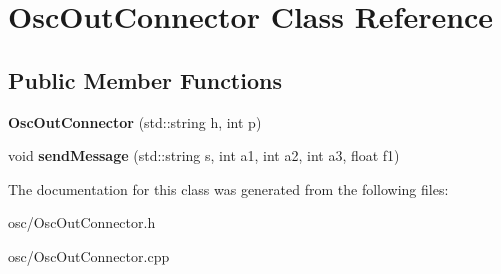 \hypertarget{classOscOutConnector}{}\section{Osc\+Out\+Connector Class Reference}
\label{classOscOutConnector}
\subsection*{Public Member Functions}
\begin{DoxyCompactItemize}
\item 
{\bfseries Osc\+Out\+Connector} (std\+::string h, int p)\hypertarget{classOscOutConnector_a7dde00203135c4a673e56f02dec774b4}{}\label{classOscOutConnector_a7dde00203135c4a673e56f02dec774b4}

\item 
void {\bfseries send\+Message} (std\+::string s, int a1, int a2, int a3, float f1)\hypertarget{classOscOutConnector_a8b3bcadf0295998b42753161ae9d17ee}{}\label{classOscOutConnector_a8b3bcadf0295998b42753161ae9d17ee}

\end{DoxyCompactItemize}


The documentation for this class was generated from the following files\+:\begin{DoxyCompactItemize}
\item 
osc/Osc\+Out\+Connector.\+h\item 
osc/Osc\+Out\+Connector.\+cpp\end{DoxyCompactItemize}

